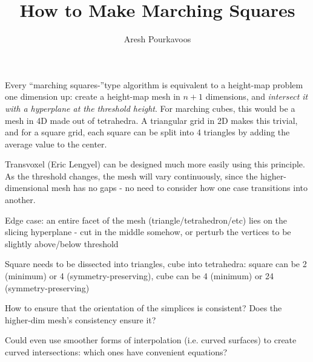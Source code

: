 \documentclass{article}
\begin{document}
\title{How to Make Marching Squares}
\author{Aresh Pourkavoos}
\maketitle

Every ``marching squares-''type algorithm is equivalent to a height-map problem one dimension up:
create a height-map mesh in $n+1$ dimensions, and \textit{intersect it with a hyperplane at the threshold height}.
For marching cubes, this would be a mesh in 4D made out of tetrahedra.
A triangular grid in 2D makes this trivial, and for a square grid,
each square can be split into 4 triangles by adding the average value to the center.

Transvoxel (Eric Lengyel) can be designed much more easily using this principle.
As the threshold changes, the mesh will vary continuously,
since the higher-dimensional mesh has no gaps -
no need to consider how one case transitions into another.

Edge case: an entire facet of the mesh (triangle/tetrahedron/etc) lies on the slicing hyperplane -
cut in the middle somehow, or perturb the vertices to be slightly above/below threshold

Square needs to be dissected into triangles, cube into tetrahedra:
square can be 2 (minimum) or 4 (symmetry-preserving),
cube can be 4 (minimum) or 24 (symmetry-preserving)

How to ensure that the orientation of the simplices is consistent?
Does the higher-dim mesh's consistency ensure it?

Could even use smoother forms of interpolation (i.e. curved surfaces)
to create curved intersections:
which ones have convenient equations?

\end{document}
